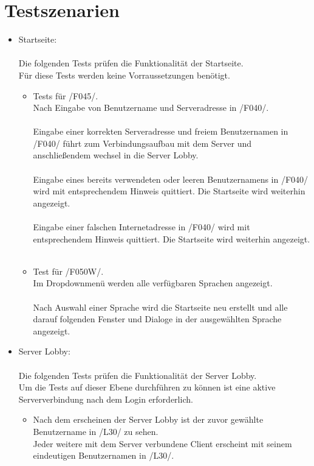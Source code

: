 \documentclass{article}
\begin{document}
\section{Testszenarien}
\begin{itemize}
	\item Startseite: \\ \\
		  Die folgenden Tests prüfen die Funktionalität der Startseite. \\
		  Für diese Tests werden keine Vorraussetzungen benötigt. \\
	\begin{itemize}
		\item Tests für /F045/. \\
			  Nach Eingabe von Benutzername und Serveradresse in /F040/. \\ \\
			  Eingabe einer korrekten Serveradresse und freiem Benutzernamen in /F040/
			  führt zum Verbindungsaufbau mit dem Server und anschließendem 
			  wechsel in die Server Lobby. \\ \\
			  Eingabe eines bereits verwendeten oder leeren Benutzernamens in /F040/
			  wird mit entsprechendem Hinweis quittiert. Die Startseite wird weiterhin angezeigt. \\ \\
			  Eingabe einer falschen Internetadresse in /F040/ wird mit entsprechendem Hinweis quittiert.
			  Die Startseite wird weiterhin angezeigt. \\ \\
		\item Test für /F050W/. \\ Im Dropdownmenü werden alle verfügbaren Sprachen angezeigt. \\ \\
			  Nach Auswahl einer Sprache wird die Startseite neu erstellt und alle darauf folgenden Fenster und 						  Dialoge in der ausgewählten Sprache angezeigt. 
			  
			  
	\end{itemize}

	\item Server Lobby: \\ \\
		  Die folgenden Tests prüfen die Funktionalität der Server Lobby. \\
		  Um die Tests auf dieser Ebene durchführen zu können ist eine aktive Serververbindung nach dem Login 					  erforderlich. \\
	\begin{itemize}
		\item Nach dem erscheinen der Server Lobby ist der zuvor gewählte Benutzername in /L30/ zu sehen. \\
			  Jeder weitere mit dem Server verbundene Client erscheint mit seinem eindeutigen Benutzernamen in /L30/.\\			  
		

\end{itemize}
\end{itemize}
\end{document}
